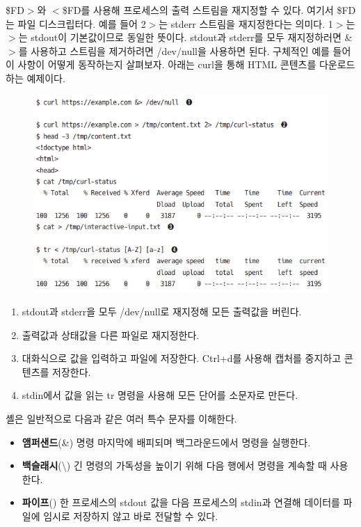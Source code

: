 \begin{flushleft}
    \$FD$>$와 $<$\$FD를 사용해 프로세스의 출력 스트림을 재지정할 수 있다.
    여기서 \$FD는 파일 디스크립터다.
    예를 들어 2$>$는 stderr 스트림을 재지정한다는 의미다.
    1$>$는 $>$는 stdout이 기본값이므로 동일한 뜻이다.
    stdout과 stderr를 모두 재지정하러면 \&$>$를 사용하고
    스트림을 제거하려면 /dev/null을 사용하면 된다.
    구체적인 예를 들어 이 사항이 어떻게 동작하는지 살펴보자.
    아래는 curl을 통해 HTML 콘텐츠를 다운로드 하는 예제이다.
\end{flushleft}

\begin{figure}[h]
    \includegraphics[width=15cm]{resource/3-curl-stream}
\end{figure}

\begin{enumerate}
    \item stdout과 stderr을 모두 /dev/null로 재지정해 모든 출력값을 버린다.
    \item 출력값과 상태값을 다른 파일로 재지정한다.
    \item 대화식으로 값을 입력하고 파일에 저장한다.
        Ctrl+d를 사용해 캡처를 중지하고 콘텐츠를 저장한다.
    \item stdin에서 값을 읽는 tr 명령을 사용해 모든 단어를 소문자로 만든다.
\end{enumerate}

\begin{flushleft}
    셸은 일반적으로 다음과 같은 여러 특수 문자를 이해한다.
\end{flushleft}

\begin{itemize}
    \item \textbf{앰퍼샌드}(\&)\newline
        명령 마지막에 배피되며 백그라운드에서 명령을 실행한다.
    \item \textbf{백슬래시}(\textbackslash)\newline
        긴 명령의 가독성을 높이기 위해 다음 행에서 명령을 계속할 때 사용한다.
    \item \textbf{파이프}(\textbar)\newline
        한 프로세스의 stdout 값을 다음 프로세스의 stdin과 연결해 데이터를
        파일에 임시로 저장하지 않고 바로 전달할 수 있다.
\end{itemize}

